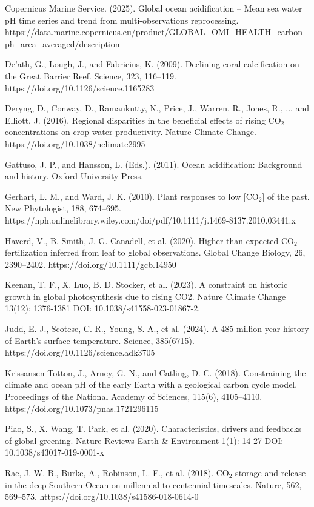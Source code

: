 \documentclass[12pt,paper=a4,DIV=12,parskip=never,chapterprefix=false,headings=standardclasses]{scrreprt}
\numberwithin{figure}{chapter}
\begin{document}
Copernicus Marine Service. (2025). Global ocean acidification – Mean sea water pH time series and trend from multi-observations reprocessing. \url{https://data.marine.copernicus.eu/product/GLOBAL_OMI_HEALTH_carbon_ph_area_averaged/description}

De'ath, G., Lough, J., and Fabricius, K. (2009). Declining coral calcification on the Great Barrier Reef. Science, 323, 116–119. https://doi.org/10.1126/science.1165283

Deryng, D., Conway, D., Ramankutty, N., Price, J., Warren, R., Jones, R., ... and Elliott, J. (2016). Regional disparities in the beneficial effects of rising CO$_2$ concentrations on crop water productivity. Nature Climate Change. https://doi.org/10.1038/nclimate2995

Gattuso, J. P., and Hansson, L. (Eds.). (2011). Ocean acidification: Background and history. Oxford University Press.

Gerhart, L. M., and Ward, J. K. (2010). Plant responses to low [CO$_2$] of the past. New Phytologist, 188, 674–695. https://nph.onlinelibrary.wiley.com/doi/pdf/10.1111/j.1469-8137.2010.03441.x

Haverd, V., B. Smith, J. G. Canadell, et al. (2020). Higher than expected CO$_2$ fertilization inferred from leaf to global observations. Global Change Biology, 26, 2390–2402. https://doi.org/10.1111/gcb.14950

Keenan, T. F., X. Luo, B. D. Stocker, et al. (2023). A constraint on historic growth in global photosynthesis due to rising CO2. Nature Climate Change 13(12): 1376-1381 DOI: 10.1038/s41558-023-01867-2.

Judd, E. J., Scotese, C. R., Young, S. A., et al. (2024). A 485-million-year history of Earth's surface temperature. Science, 385(6715). https://doi.org/10.1126/science.adk3705

Krissansen-Totton, J., Arney, G. N., and Catling, D. C. (2018). Constraining the climate and ocean pH of the early Earth with a geological carbon cycle model. Proceedings of the National Academy of Sciences, 115(6), 4105–4110. https://doi.org/10.1073/pnas.1721296115

Piao, S., X. Wang, T. Park, et al. (2020). Characteristics, drivers and feedbacks of global greening. Nature Reviews Earth \& Environment 1(1): 14-27 DOI: 10.1038/s43017-019-0001-x

Rae, J. W. B., Burke, A., Robinson, L. F., et al. (2018). CO$_2$ storage and release in the deep Southern Ocean on millennial to centennial timescales. Nature, 562, 569–573. https://doi.org/10.1038/s41586-018-0614-0
\end{document}
